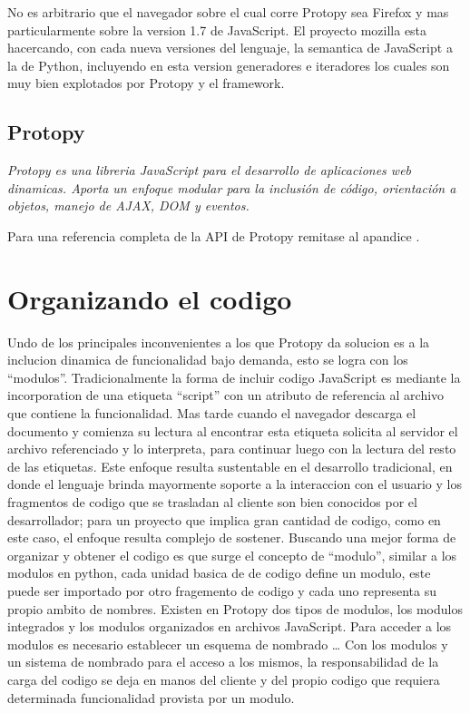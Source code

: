 No es arbitrario que el navegador sobre el cual corre Protopy sea Firefox y
mas particularmente sobre la version 1.7 de JavaScript. El proyecto mozilla
esta hacercando, con cada nueva versiones del lenguaje, la semantica de JavaScript a
la de Python, incluyendo en esta version generadores e iteradores los cuales
son muy bien explotados por Protopy y el framework.

\subsection*{Protopy}
\textit{Protopy es una libreria JavaScript para el desarrollo de aplicaciones
web dinamicas. Aporta un enfoque modular para la inclusión de código,
orientación a objetos, manejo de AJAX, DOM y eventos.}

Para una referencia completa de la API de Protopy remitase al apandice
.

\section{Organizando el codigo}
Undo de los principales inconvenientes a los que Protopy da solucion es a la
inclucion dinamica de funcionalidad bajo demanda, esto se logra con los
``modulos''.
Tradicionalmente la forma de incluir codigo JavaScript es mediante la
incorporation de una etiqueta ``script'' con un atributo de referencia
al archivo que contiene la funcionalidad. Mas tarde cuando el navegador descarga
el documento y comienza su lectura al encontrar esta etiqueta solicita
al servidor el archivo referenciado y lo interpreta, para continuar luego con la
lectura del resto de las etiquetas. Este enfoque resulta sustentable en el
desarrollo tradicional, en donde el lenguaje brinda mayormente soporte a la
interaccion con el usuario y los fragmentos de codigo que se trasladan al
cliente son bien conocidos por el desarrollador; para un proyecto que implica
gran cantidad de codigo, como en este caso, el enfoque resulta complejo de
sostener.
Buscando una mejor forma de organizar y obtener el codigo es que surge el
concepto de ``modulo'', similar a los modulos en python, cada unidad basica de
de codigo define un modulo, este puede ser importado por otro fragemento de
codigo y cada uno representa su propio ambito de nombres. Existen en Protopy
dos tipos de modulos, los modulos integrados y los modulos organizados en
archivos JavaScript.
Para acceder a los modulos es necesario establecer un esquema de nombrado \ldots
Con los modulos y un sistema de nombrado para el acceso a los mismos, la
responsabilidad de la carga del codigo se deja en manos del cliente y del
propio codigo que requiera determinada funcionalidad provista por un modulo.

